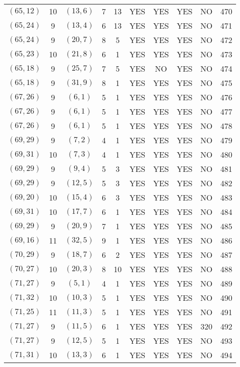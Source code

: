 \begin{longtable}{|c|c|c|c|c|c|c|c|c|c|}
$(65, 12)$ & 10 & $(13, 6)$ & 7 & 13 & YES & YES & YES & NO & 470\\
$(65, 24)$ & 9 & $(13, 4)$ & 6 & 13 & YES & YES & YES & NO & 471\\
$(65, 24)$ & 9 & $(20, 7)$ & 8 & 5 & YES & YES & YES & NO & 472\\
$(65, 23)$ & 10 & $(21, 8)$ & 6 & 1 & YES & YES & YES & NO & 473\\
$(65, 18)$ & 9 & $(25, 7)$ & 7 & 5 & YES & NO & YES & NO & 474\\
$(65, 18)$ & 9 & $(31, 9)$ & 8 & 1 & YES & YES & YES & NO & 475\\
$(67, 26)$ & 9 & $(6, 1)$ & 5 & 1 & YES & YES & YES & NO & 476\\
$(67, 26)$ & 9 & $(6, 1)$ & 5 & 1 & YES & YES & YES & NO & 477\\
$(67, 26)$ & 9 & $(6, 1)$ & 5 & 1 & YES & YES & YES & NO & 478\\
$(69, 29)$ & 9 & $(7, 2)$ & 4 & 1 & YES & YES & YES & NO & 479\\
$(69, 31)$ & 10 & $(7, 3)$ & 4 & 1 & YES & YES & YES & NO & 480\\
$(69, 29)$ & 9 & $(9, 4)$ & 5 & 3 & YES & YES & YES & NO & 481\\
$(69, 29)$ & 9 & $(12, 5)$ & 5 & 3 & YES & YES & YES & NO & 482\\
$(69, 20)$ & 10 & $(15, 4)$ & 6 & 3 & YES & YES & YES & NO & 483\\
$(69, 31)$ & 10 & $(17, 7)$ & 6 & 1 & YES & YES & YES & NO & 484\\
$(69, 29)$ & 9 & $(20, 9)$ & 7 & 1 & YES & YES & YES & NO & 485\\
$(69, 16)$ & 11 & $(32, 5)$ & 9 & 1 & YES & YES & YES & NO & 486\\
$(70, 29)$ & 9 & $(18, 7)$ & 6 & 2 & YES & YES & YES & NO & 487\\
$(70, 27)$ & 10 & $(20, 3)$ & 8 & 10 & YES & YES & YES & NO & 488\\
$(71, 27)$ & 9 & $(5, 1)$ & 4 & 1 & YES & YES & YES & NO & 489\\
$(71, 32)$ & 10 & $(10, 3)$ & 5 & 1 & YES & YES & YES & NO & 490\\
$(71, 25)$ & 11 & $(11, 3)$ & 5 & 1 & YES & YES & YES & NO & 491\\
$(71, 27)$ & 9 & $(11, 5)$ & 6 & 1 & YES & YES & YES & 320 & 492\\
$(71, 27)$ & 9 & $(12, 5)$ & 5 & 1 & YES & YES & YES & NO & 493\\
$(71, 31)$ & 10 & $(13, 3)$ & 6 & 1 & YES & YES & YES & NO & 494\\

\end{longtable}
